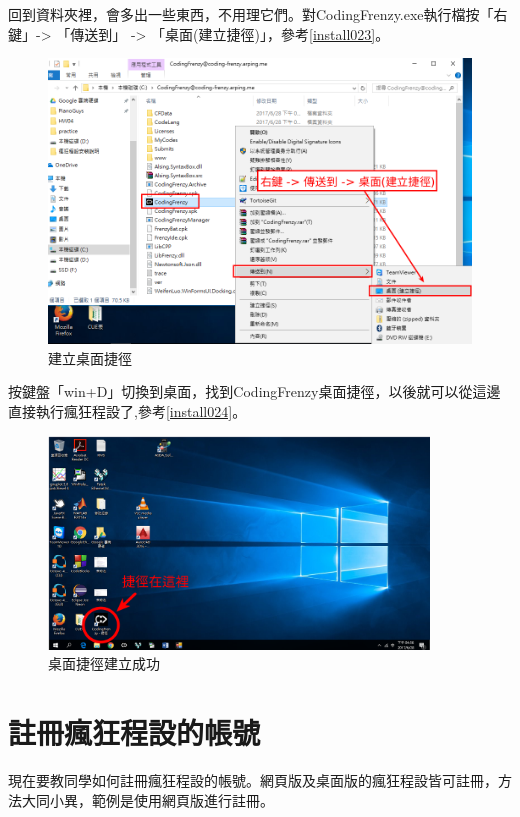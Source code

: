 		回到資料夾裡，會多出一些東西，不用理它們。對CodingFrenzy.exe執行檔按「右鍵」-> 「傳送到」 -> 「桌面(建立捷徑)」，參考\autoref{install023}。
		\begin{figure}[H]
			\centering
			\includegraphics[width=\textwidth]{fig/install_and_setting/install_023}
			\caption{建立桌面捷徑}
			\label{install023}
		\end{figure}
	
		按鍵盤「win+D」切換到桌面，找到CodingFrenzy桌面捷徑，以後就可以從這邊直接執行瘋狂程設了,參考\autoref{install024}。
		\begin{figure}[H]
			\centering
			\includegraphics[width=0.9\textwidth]{fig/install_and_setting/install_024}
			\caption{桌面捷徑建立成功}
			\label{install024}
		\end{figure}

\section{註冊瘋狂程設的帳號}
現在要教同學如何註冊瘋狂程設的帳號。網頁版及桌面版的瘋狂程設皆可註冊，方法大同小異，範例是使用網頁版進行註冊。

